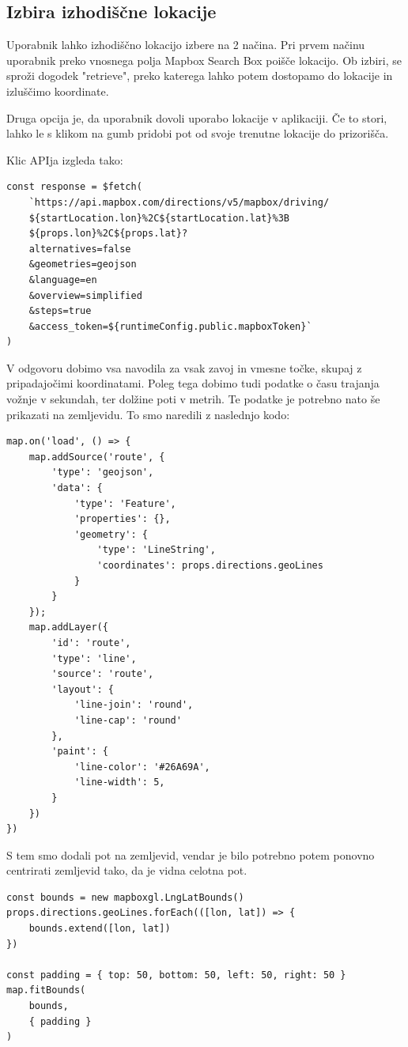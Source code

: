 \documentclass[a4paper,12pt,openright]{book}
\begin{document}
\subsection{Izbira izhodiščne lokacije}
Uporabnik lahko izhodiščno lokacijo izbere na 2 načina.
Pri prvem načinu uporabnik preko vnosnega polja Mapbox Search Box poišče lokacijo.
Ob izbiri, se sproži dogodek "retrieve", preko katerega lahko potem dostopamo do lokacije in izluščimo koordinate.

Druga opcija je, da uporabnik dovoli uporabo lokacije v aplikaciji.
Če to stori, lahko le s klikom na gumb pridobi pot od svoje trenutne lokacije do prizorišča.

Klic APIja izgleda tako:
\begin{lstlisting}[label=code5,caption=URL za klic Mapbox Directions APIja\, ki vrne navodila za pot v formatu GeoJSON.,frame=tb,captionpos=b]
const response = $fetch(
    `https://api.mapbox.com/directions/v5/mapbox/driving/
    ${startLocation.lon}%2C${startLocation.lat}%3B
    ${props.lon}%2C${props.lat}?
    alternatives=false
    &geometries=geojson
    &language=en
    &overview=simplified
    &steps=true
    &access_token=${runtimeConfig.public.mapboxToken}`
)
\end{lstlisting}

V odgovoru dobimo vsa navodila za vsak zavoj in vmesne točke, skupaj z pripadajočimi koordinatami.
Poleg tega dobimo tudi podatke o času trajanja vožnje v sekundah, ter dolžine poti v metrih.
Te podatke je potrebno nato še prikazati na zemljevidu.
To smo naredili z naslednjo kodo:
\begin{lstlisting}[label=code6,caption=Izvorna koda za prikaz poti na zemljevidu.,frame=tb,captionpos=b]
map.on('load', () => {
    map.addSource('route', {
        'type': 'geojson',
        'data': {
            'type': 'Feature',
            'properties': {},
            'geometry': {
                'type': 'LineString',
                'coordinates': props.directions.geoLines
            }
        }
    });
    map.addLayer({
        'id': 'route',
        'type': 'line',
        'source': 'route',
        'layout': {
            'line-join': 'round',
            'line-cap': 'round'
        },
        'paint': {
            'line-color': '#26A69A',
            'line-width': 5,
        }
    })
})
\end{lstlisting}

S tem smo dodali pot na zemljevid, vendar je bilo potrebno potem ponovno centrirati zemljevid tako, da je vidna celotna pot.
\begin{lstlisting}[label=code7,caption=Prilagoditev središča zemljevida in stopnje povečave\, da ustreza geografskemu območju poti.,frame=tb,captionpos=b]
const bounds = new mapboxgl.LngLatBounds()
props.directions.geoLines.forEach(([lon, lat]) => {
    bounds.extend([lon, lat])
})

const padding = { top: 50, bottom: 50, left: 50, right: 50 }
map.fitBounds(
    bounds,
    { padding }
)
\end{lstlisting}
\end{document}
